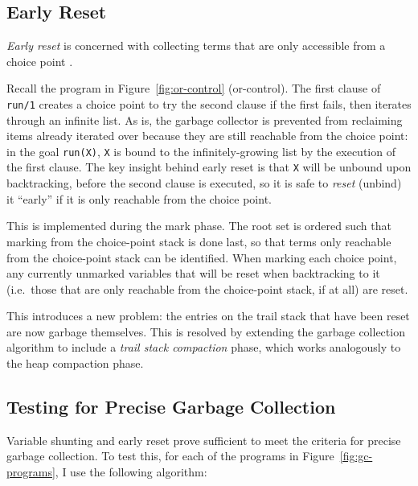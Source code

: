 
\subsection{Early Reset}

\label{sec:early-reset}

\emph{Early reset} is concerned with collecting terms that are only accessible from a choice point \cite{applebyGarbargecollectionProlog1988}.

Recall the program in Figure~\ref{fig:or-control} (or-control). The first clause of \texttt{run/1} creates a choice point to try the second clause if the first fails, then iterates through an infinite list. As is, the garbage collector is prevented from reclaiming items already iterated over because they are still reachable from the choice point: in the goal \texttt{run(X)}, \texttt{X} is bound to the infinitely-growing list by the execution of the first clause. The key insight behind early reset is that \texttt{X} will be unbound upon backtracking, before the second clause is executed, so it is safe to \emph{reset} (unbind) it ``early'' if it is only reachable from the choice point.

This is implemented during the mark phase. The root set is ordered such that marking from the choice-point stack is done last, so that terms only reachable from the choice-point stack can be identified. When marking each choice point, any currently unmarked variables that will be reset when backtracking to it (i.e.\ those that are only reachable from the choice-point stack, if at all) are reset.

This introduces a new problem: the entries on the trail stack that have been reset are now garbage themselves. This is resolved by extending the garbage collection algorithm to include a \emph{trail stack compaction} phase, which works analogously to the heap compaction phase.

\subsection{Testing for Precise Garbage Collection}

\label{sec:gc-testing}

Variable shunting and early reset prove sufficient to meet the criteria for precise garbage collection. To test this, for each of the programs in Figure~\ref{fig:gc-programs}, I use the following algorithm:

